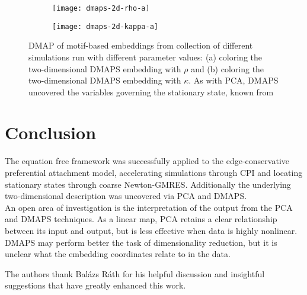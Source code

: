 \documentclass[epjST, final]{svjour}
\begin{document}
\begin{onehalfspace}
\begin{figure}[h!]
  \vspace{-5mm}
  \centering
  \begin{subfigure}{0.49\textwidth}
    \centering
    \texttt{[image: dmaps-2d-rho-a]}
    \subcaption{\label{fig:dmaps-rho}}
  \end{subfigure} %
  \begin{subfigure}{0.49\textwidth}
    \centering
    \texttt{[image: dmaps-2d-kappa-a]}
    \subcaption{\label{fig:dmaps-kappa}}
  \end{subfigure}%
  \caption{DMAP of motif-based embeddings from collection of different
    simulations run with different parameter values: (a) coloring the
    two-dimensional DMAPS embedding with $\rho$ and (b) coloring the
    two-dimensional DMAPS embedding with $\kappa$. As with PCA, DMAPS
    uncovered the variables governing the stationary state, known from
    \cite{rath_time_2012} \label{fig:dmaps-rk}}
\end{figure}


\section{Conclusion}

The equation free framework was successfully applied to the edge-conservative preferential attachment model, accelerating simulations through CPI and locating stationary states through coarse Newton-GMRES. Additionally the underlying two-dimensional description was uncovered via PCA and DMAPS. \\

An open area of investigation is the interpretation of the output from the PCA and DMAPS techniques. As a linear map, PCA retains a clear relationship between its input and output, but is less effective when data is highly nonlinear. DMAPS may perform better the task of dimensionality reduction, but it is unclear what the embedding coordinates relate to in the data.


 


\begin{acknowledgement}
The authors thank Bal\'{a}zs R\'{a}th for his helpful discussion and
insightful suggestions that have greatly enhanced this work.
\end{acknowledgement}

\end{onehalfspace}



\end{document}
